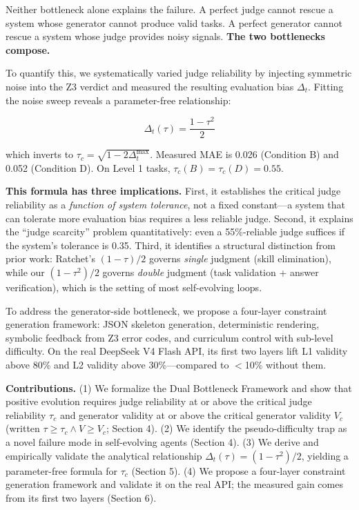 \documentclass{article}
\begin{document}
Neither bottleneck alone explains the failure. A perfect judge cannot rescue a system whose
generator cannot produce valid tasks. A perfect generator cannot rescue a system whose judge
provides noisy signals. \textbf{The two bottlenecks compose.}

To quantify this, we systematically varied judge reliability by injecting symmetric noise into the
Z3 verdict and measured the resulting evaluation bias $\Delta_t$. Fitting the noise sweep reveals a
parameter-free relationship:

\[
  \Delta_t(\tau) = \frac{1-\tau^2}{2}
\]

which inverts to $\tau_c = \sqrt{1 - 2\Delta_t^{\max}}$. Measured MAE is 0.026 (Condition B) and
0.052 (Condition D). On Level 1 tasks, $\tau_c(B) = \tau_c(D) = 0.55$.

\textbf{This formula has three implications.} First, it establishes the critical judge reliability
as a \textit{function of system tolerance}, not a fixed constant---a system that can tolerate more
evaluation bias requires a less reliable judge. Second, it explains the ``judge scarcity'' problem
quantitatively: even a 55\%-reliable judge suffices if the system's tolerance is 0.35. Third, it
identifies a structural distinction from prior work: Ratchet's $(1-\tau)/2$ governs \textit{single}
judgment (skill elimination), while our $(1-\tau^2)/2$ governs \textit{double} judgment (task
validation + answer verification), which is the setting of most self-evolving loops.

To address the generator-side bottleneck, we propose a four-layer constraint generation framework:
JSON skeleton generation, deterministic rendering, symbolic feedback from Z3 error codes, and
curriculum control with sub-level difficulty. On the real DeepSeek V4 Flash API, its first two layers
lift L1 validity above 80\% and L2 validity above 30\%---compared to $<$10\% without them.

\textbf{Contributions.} (1) We formalize the Dual Bottleneck Framework and show that positive
evolution requires judge reliability at or above the critical judge reliability $\tau_c$ and generator
validity at or above the critical generator validity $V_c$ (written
$\tau \ge \tau_c \land V \ge V_c$; Section 4). (2) We identify the
pseudo-difficulty trap as a novel failure mode in self-evolving agents (Section 4). (3) We derive
and empirically validate the analytical relationship $\Delta_t(\tau) = (1-\tau^2)/2$, yielding a
parameter-free formula for $\tau_c$ (Section 5). (4) We propose a four-layer constraint generation
framework and validate it on the real API; the measured gain comes from its first two layers
(Section 6).
\end{document}
